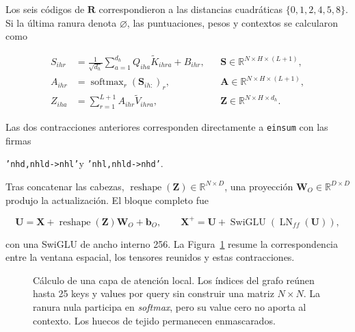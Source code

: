 Los seis códigos de \(\mathbf R\) correspondieron a las distancias cuadráticas
\(\{0,1,2,4,5,8\}\). Si la última ranura denota \(\varnothing\), las
puntuaciones, pesos y contextos se calcularon como

\begin{equation}
    \begin{aligned}
    S_{ihr}&=\frac{1}{\sqrt{d_h}}
      \sum_{a=1}^{d_h}Q_{iha}\widetilde K_{ihra}+B_{ihr},
      &&\mathbf S\in\mathbb R^{N\times H\times(L+1)},\\
    A_{ihr}&=\operatorname{softmax}_{r}(\mathbf S_{ih:})_r,
      &&\mathbf A\in\mathbb R^{N\times H\times(L+1)},\\
    Z_{iha}&=\sum_{r=1}^{L+1}A_{ihr}\widetilde V_{ihra},
      &&\mathbf Z\in\mathbb R^{N\times H\times d_h}.
    \end{aligned}
    \label{eq:tensores-atencion-local-mil}
\end{equation}

Las dos contracciones anteriores corresponden directamente a \texttt{einsum}
con las firmas
\begin{center}
    \texttt{'nhd,nhld->nhl'}\qquad y\qquad
    \texttt{'nhl,nhld->nhd'}.
\end{center}
Tras concatenar las cabezas,
\(\operatorname{reshape}(\mathbf Z)\in\mathbb R^{N\times D}\), una proyección
\(\mathbf W_O\in\mathbb R^{D\times D}\) produjo la actualización. El bloque
completo fue

\begin{equation}
    \mathbf U=\mathbf X+\operatorname{reshape}(\mathbf Z)\mathbf W_O+\mathbf b_O,
    \qquad
    \mathbf X^{+}=\mathbf U+
      \operatorname{SwiGLU}(\operatorname{LN}_{ff}(\mathbf U)),
    \label{eq:residuales-local-mil}
\end{equation}

con una SwiGLU de ancho interno 256. La Figura~\ref{fig:calculo-atencion-local}
resume la correspondencia entre la ventana espacial, los tensores reunidos y
estas contracciones.

\begin{figure}[p]
    \centering
    \resizebox{\textwidth}{!}{}
    \caption{Cálculo de una capa de atención local. Los índices del grafo
    reúnen hasta 25 keys y values por query sin construir una matriz
    \(N\times N\). La ranura nula participa en \emph{softmax}, pero su value
    cero no aporta al contexto. Los huecos de tejido permanecen enmascarados.}
    \label{fig:calculo-atencion-local}
\end{figure}

